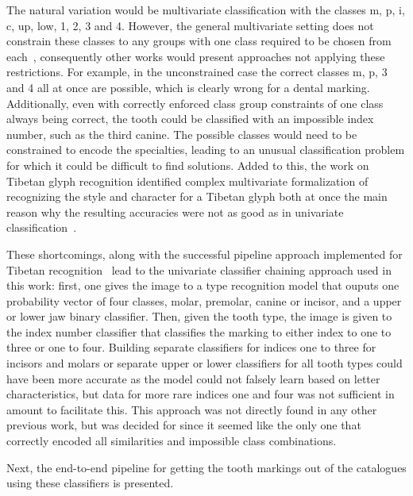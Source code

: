 \documentclass[english,twoside,openright]{UH_DS_MSc}
\begin{document}
The natural variation would be multivariate classification with the classes m, p, i, c, up, low, 1, 2, 3 and 4. However, 
the general multivariate setting does not constrain these classes to any groups with one class required to be chosen from 
each~\cite{multilabel_classification}, consequently other works would present approaches not applying these restrictions.
For example, in the unconstrained case the correct classes m, p, 3 and 4 all at 
once are possible, which is clearly wrong for a dental marking. Additionally, even with correctly enforced class group constraints of one class always being correct, the tooth could be classified with an impossible index number, such as the third canine.
The possible classes would need to be constrained to encode the specialties, leading to an unusual classification problem for which it could be difficult to 
find solutions. Added to this, the work on Tibetan glyph recognition identified complex multivariate formalization of 
recognizing the style and character for a Tibetan glyph both at once the main reason why the resulting 
accuracies were not as good as in univariate classification~\cite{4zhaoTibetan}.

These shortcomings, along with the successful pipeline approach implemented for Tibetan recognition~\cite{4zhaoTibetan}
lead to the univariate classifier chaining approach used in this work: first, one gives the image to a type recognition 
model that ouputs one probability vector of four classes, molar, premolar, canine or incisor, and a upper or lower jaw 
binary classifier. Then, given the tooth type, the image is given to the index number classifier that classifies the marking 
to either index to one to three or one to four. Building separate classifiers for indices one to three for incisors and molars
or separate upper or lower classifiers for all tooth types 
could have been more accurate as the model could not falsely learn based on letter characteristics, but data for more rare indices 
one and four was not sufficient in amount to facilitate this.
This approach was not directly found in any other previous work, but was decided 
for since it seemed like the only one that correctly encoded all similarities and impossible class combinations. 

Next, the end-to-end pipeline for getting the tooth markings out of the catalogues using these classifiers is presented.
\end{document}
